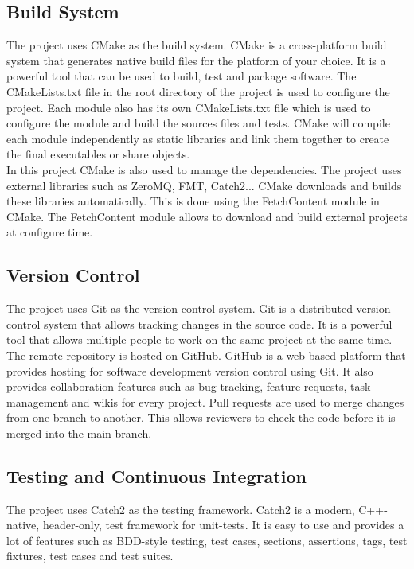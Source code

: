\begin{spacing}{1.2}
    \subsection{Build System}
    The project uses CMake as the build system. CMake is a cross-platform build system that
    generates native build files for the platform of your choice. It is a powerful tool that
    can be used to build, test and package software. The CMakeLists.txt file in the root directory
    of the project is used to configure the project. Each module also has its own CMakeLists.txt
    file which is used to configure the module and build the sources files and tests. CMake will compile
    each module independently as static libraries and link them together to create the final
    executables or share objects.\\

    In this project CMake is also used to manage the dependencies. The project uses external
    libraries such as ZeroMQ, FMT, Catch2... CMake downloads and builds these libraries
    automatically. This is done using the FetchContent module in CMake. The FetchContent module
    allows to download and build external projects at configure time.

    \subsection{Version Control}
    The project uses Git as the version control system. Git is a distributed version control system
    that allows tracking changes in the source code. It is a powerful tool that allows multiple people
    to work on the same project at the same time.\\

    The remote repository is hosted on GitHub. GitHub is a web-based platform that provides
    hosting for software development version control using Git. It also provides collaboration
    features such as bug tracking, feature requests, task management and wikis for every project.
    Pull requests are used to merge changes from one branch to another. This allows reviewers
    to check the code before it is merged into the main branch.\\



    \subsection{Testing and Continuous Integration}
    The project uses Catch2 as the testing framework. Catch2 is a modern, C++-native, header-only,
    test framework for unit-tests. It is easy to use and provides a lot of features such as
    BDD-style testing, test cases, sections, assertions, tags, test fixtures, test cases
    and test suites.\\


\end{spacing}
